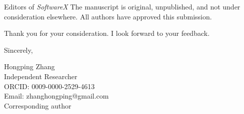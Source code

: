 \documentclass[10pt]{letter}
\begin{document}
\begin{letter}{Editors of \textit{SoftwareX}}
The manuscript is original, unpublished, and not under consideration elsewhere. All authors have approved this submission.

Thank you for your consideration. I look forward to your feedback.

\closing{Sincerely,}

\noindent
Hongping Zhang\textsuperscript{\textdagger} \\
Independent Researcher \\
ORCID: 0009-0000-2529-4613 \\
Email: zhanghongping@gmail.com \\
\textsuperscript{\textdagger}Corresponding author

\end{letter}
\end{document}
